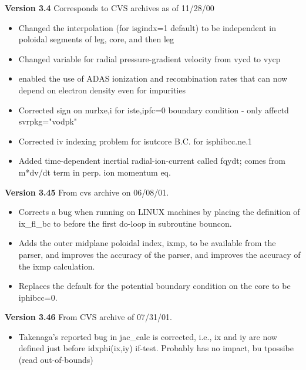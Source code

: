 \documentclass [12pt]{article}
\begin{document}
\noindent\textbf{Version 3.4}  Corresponds to CVS archives as of 11/28/00
\begin{itemize}
     \item Changed the interpolation (for isgindx=1 default) to be 
           independent in poloidal segments of leg, core, and then leg
     \item Changed variable for radial pressure-gradient velocity from
           vycd to vycp
     \item enabled the use of ADAS ionization and recombination rates
           that can now depend on electron density even for impurities
     \item Corrected sign on nurlxe,i for iste,ipfc=0 boundary
           condition - only affectd svrpkg="vodpk"
     \item Corrected iv indexing problem for isutcore B.C. for
           isphibcc.ne.1
     \item Added time-dependent inertial radial-ion-current called
           fqydt; comes from m*dv/dt term in perp. ion momentum eq.
\end{itemize}

\noindent\textbf{Version 3.45} From cvs archive on 06/08/01.  
\begin{itemize}
    \item Corrects a bug when running on LINUX machines by placing the 
          definition of ix\_fl\_bc to before the first do-loop in 
          subroutine bouncon.  
    \item Adds the outer midplane poloidal index, ixmp, to be available 
          from the parser, and improves the accuracy of the parser,
          and improves the accuracy of the ixmp calculation.
    \item Replaces the default for the potential boundary
                condition on the core to be iphibcc=0.
\end{itemize}

\noindent\textbf{Version 3.46} From CVS archive of 07/31/01.
\begin{itemize}
   \item Takenaga's reported bug in jac\_calc is corrected, i.e., 
         ix and iy are now defined just before idxphi(ix,iy) if-test.
         Probably has no impact, bu tpossibe (read out-of-bounds)
\end{itemize}
\end{document}
